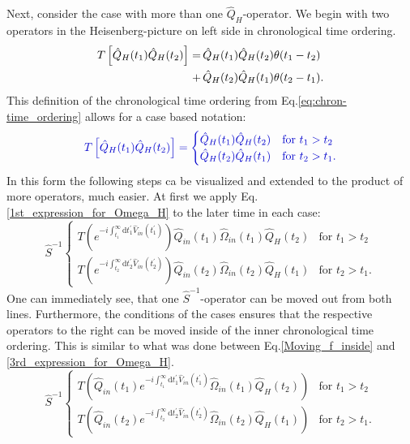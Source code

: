 \documentclass[12pt, titlepage]{article}
\begin{document}
Next, consider the case with more than one $ \hat{Q}_{H} $-operator. We begin with two operators in the Heisenberg-picture on left side in chronological time ordering.
\begin{equation}
\begin{split}
T\left[
\hat{Q}_{H}(t_1)
\hat{Q}_{H}(t_2)
\right]
=&
\thinspace
\hat{Q}_{H}(t_1)
\hat{Q}_{H}(t_2)
\theta(t_{1}-t_{2})
\\
\thinspace\thinspace
+&
\thinspace
\hat{Q}_{H}(t_2)
\hat{Q}_{H}(t_1)
\theta(t_{2}-t_{1})
.
\end{split}
\end{equation}
This definition of the chronological time ordering from  Eq.\enskip\eqref{eq:chron-time_ordering} allows for a case based notation:
\begin{equation}
 \textcolor[RGB]{0,0,204}{
  T\left[
\hat{Q}_{H}(t_1)
\hat{Q}_{H}(t_2)
\right] = \begin{cases}
      \hat{Q}_{H}(t_1)\hat{Q}_{H}(t_2) & \text{for $t_1 > t_2$} \\
      \hat{Q}_{H}(t_2)\hat{Q}_{H}(t_1) & \text{for $t_2 > t_1$}.
    \end{cases}
  }
\end{equation}
In this form the following steps ca be visualized and extended to the product of more operators, much easier. At first we apply Eq.\enskip\eqref{1st_expression_for_Omega_H} to the later time in each case:
\begin{equation}
\hat{S}^{-1}
\begin{cases}
T\left(  e^{-i\int_{t_{1}}^{\infty}\mathrm{d}t^{\prime}_{1} \hat{V}_{in}(t_{1}^{\prime})}\right)\hat{Q}_{in}(t_{1})\hat{\Omega}_{in}(t_1) \hat{Q}_{H}(t_2) & \text{for $t_1 > t_2$}
		\\
     T\left(  e^{-i\int_{t_{2}}^{\infty}\mathrm{d}t^{\prime}_{2} \hat{V}_{in}(t_{2}^{\prime})}\right)\hat{Q}_{in}(t_{2})\hat{\Omega}_{in}(t_2) 
      \hat{Q}_{H}(t_1) & \text{for $t_2 > t_1$}.
    \end{cases}   
\end{equation}
One can immediately see, that one $ \hat{S}^{-1} $-operator can be moved out from both lines. Furthermore, the conditions of the cases ensures that the respective operators to the right can be moved inside of the inner chronological time ordering. This is similar to what was done between Eq.\enskip\eqref{Moving_f_inside} and \eqref{3rd_expression_for_Omega_H}. 
\begin{equation}
\hat{S}^{-1}
\begin{cases}
T\left(\hat{Q}_{in}(t_{1})  e^{-i\int_{t_{1}}^{\infty}\mathrm{d}t^{\prime}_{1} \hat{V}_{in}(t_{1}^{\prime})}\hat{\Omega}_{in}(t_1) \hat{Q}_{H}(t_2)\right) & \text{for $t_1 > t_2$}
		\\
     T\left(\hat{Q}_{in}(t_{2})  e^{-i\int_{t_{2}}^{\infty}\mathrm{d}t^{\prime}_{2} \hat{V}_{in}(t_{2}^{\prime})}\hat{\Omega}_{in}(t_2)  \hat{Q}_{H}(t_1)\right)
      & \text{for $t_2 > t_1$}.
    \end{cases}   
\end{equation}
\end{document}
